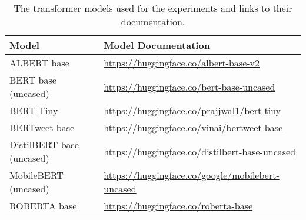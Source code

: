 \begin{table}[ht]
    \captionsetup{font=small}
    \centering
    \begin{tabularx}{\textwidth}{|l|X|}
        \hline
        \rowcolor[gray]{0.7}
        \textbf{Model}            & \textbf{Model Documentation}                                   \\
        \hline

        ALBERT base               & \small{\url{https://huggingface.co/albert-base-v2}}            \\
        \hline
        BERT base (uncased)       & \small{\url{https://huggingface.co/bert-base-uncased}}         \\
        \hline
        BERT Tiny                 & \small{\url{https://huggingface.co/prajjwal1/bert-tiny}}       \\
        \hline
        BERTweet base             & \small{\url{https://huggingface.co/vinai/bertweet-base}}       \\
        \hline
        DistilBERT base (uncased) & \small{\url{https://huggingface.co/distilbert-base-uncased}}   \\
        \hline
        MobileBERT (uncased)      & \small{\url{https://huggingface.co/google/mobilebert-uncased}} \\
        \hline
        ROBERTA base              & \small{\url{https://huggingface.co/roberta-base}}              \\
        \hline
    \end{tabularx}
    \caption{The transformer models used for the experiments and links to their documentation.}
    \label{tab: apdx_model_doc}
\end{table}
